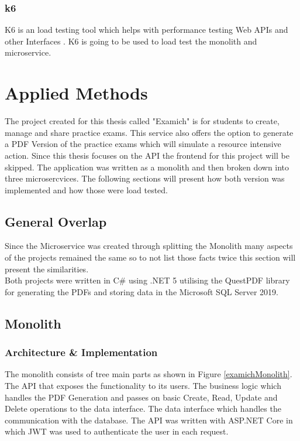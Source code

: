 \documentclass[BIF,Bachelor,nenglish]{twbook}%
\begin{document}
\subsection{k6}
K6 is an load testing tool which helps with performance testing Web \ac{API}s and other Interfaces \cite{k6doc}. K6 is going to be used to load test the monolith and microservice.

\clearpage
\chapter{Applied Methods}
The project created for this thesis called "Examich" is for students to create, manage and share practice exams. This service also offers the option to generate a PDF Version of the practice exams which will simulate a resource intensive action. Since this thesis focuses on the \ac{API} the frontend for this project will be skipped. The application was written as a monolith and then broken down into three microsercvices. The following sections will present how both version was implemented and how those were load tested.

\section{General Overlap}
Since the Microservice was created through splitting the Monolith many aspects of the projects remained the same so to not list those facts twice this section will present the similarities.
\\
\noindent
Both projects were written in C\# using .NET 5 utilising the QuestPDF library for generating the PDFs and storing data in the Microsoft SQL Server 2019.

\section{Monolith}

\subsection{Architecture \& Implementation}
The monolith consists of tree main parts as shown in Figure \ref{examichMonolith}. The \ac{API} that exposes the functionality to its users. The business logic which handles the PDF Generation and passes on basic Create, Read, Update and Delete operations to the data interface. The data interface which handles the communication with the database. The \ac{API} was written with ASP.NET Core in which \ac{JWT} was used to authenticate the user in each request.
\end{document}
